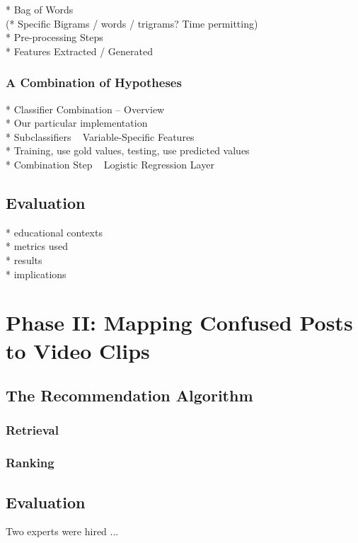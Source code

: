 \documentclass{edm_template}
\begin{document}
* Bag of Words \\
(* Specific Bigrams / words / trigrams? Time permitting) \\
* Pre-processing Steps \\
* Features Extracted / Generated \\

\subsubsection{A Combination of Hypotheses}
* Classifier Combination -- Overview \\
* Our particular implementation \\
* Subclassifiers ~ Variable-Specific Features \\
* Training, use gold values, testing, use predicted values \\
* Combination Step ~ Logistic Regression Layer \\

\subsection{Evaluation}

* educational contexts \\
* metrics used \\ 
* results \\
* implications \\

\section{Phase II: Mapping Confused Posts to Video Clips}
\subsection{The Recommendation Algorithm}
\subsubsection{Retrieval}
\subsubsection{Ranking}

\subsection{Evaluation}
Two experts were hired ...
\end{document}
